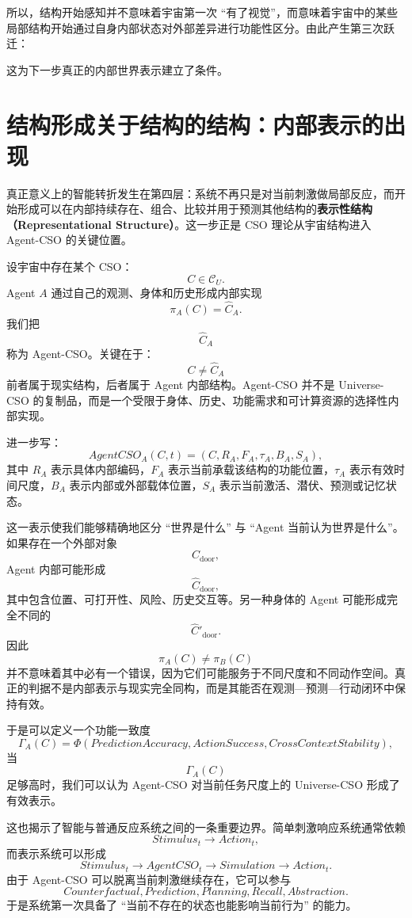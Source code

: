 所以，结构开始感知并不意味着宇宙第一次 ``有了视觉''，而意味着宇宙中的某些局部结构开始通过自身内部状态对外部差异进行功能性区分。由此产生第三次跃迁：
\begin{statementbox}
\centering
{}
\end{statementbox}
这为下一步真正的内部世界表示建立了条件。

\section{结构形成关于结构的结构：内部表示的出现}

真正意义上的智能转折发生在第四层：系统不再只是对当前刺激做局部反应，而开始形成可以在内部持续存在、组合、比较并用于预测其他结构的\textbf{表示性结构（Representational Structure）}。这一步正是 CSO 理论从宇宙结构进入 Agent-CSO 的关键位置。

设宇宙中存在某个 CSO：
\[
C\in\mathcal C_U.
\]
Agent $A$ 通过自己的观测、身体和历史形成内部实现
\[
\pi_A(C)=\hat C_A.
\]
我们把
\[
\hat C_A
\]
称为 Agent-CSO。关键在于：
\[
\boxed{
C\neq\hat C_A
}
\]
前者属于现实结构，后者属于 Agent 内部结构。Agent-CSO 并不是 Universe-CSO 的复制品，而是一个受限于身体、历史、功能需求和可计算资源的选择性内部实现。

进一步写：
\[
AgentCSO_A(C,t)
=
(C,R_A,F_A,\tau_A,B_A,S_A),
\]
其中 $R_A$ 表示具体内部编码，$F_A$ 表示当前承载该结构的功能位置，$\tau_A$ 表示有效时间尺度，$B_A$ 表示内部或外部载体位置，$S_A$ 表示当前激活、潜伏、预测或记忆状态。

这一表示使我们能够精确地区分 ``世界是什么'' 与 ``Agent 当前认为世界是什么''。如果存在一个外部对象
\[
C_{\text{door}},
\]
Agent 内部可能形成
\[
\hat C_{\text{door}},
\]
其中包含位置、可打开性、风险、历史交互等。另一种身体的 Agent 可能形成完全不同的
\[
\hat C'_{\text{door}}.
\]
因此
\[
\pi_A(C)\neq\pi_B(C)
\]
并不意味着其中必有一个错误，因为它们可能服务于不同尺度和不同动作空间。真正的判据不是内部表示与现实完全同构，而是其能否在观测—预测—行动闭环中保持有效。

于是可以定义一个功能一致度
\[
\Gamma_A(C)
=
\Phi(
PredictionAccuracy,
ActionSuccess,
CrossContextStability
),
\]
当
\[
\Gamma_A(C)
\]
足够高时，我们可以认为 Agent-CSO 对当前任务尺度上的 Universe-CSO 形成了有效表示。

这也揭示了智能与普通反应系统之间的一条重要边界。简单刺激响应系统通常依赖
\[
Stimulus_t\rightarrow Action_t,
\]
而表示系统可以形成
\[
Stimulus_t
\rightarrow
AgentCSO_t
\rightarrow
Simulation
\rightarrow
Action_t.
\]
由于 Agent-CSO 可以脱离当前刺激继续存在，它可以参与
\[
Counterfactual,
Prediction,
Planning,
Recall,
Abstraction.
\]
于是系统第一次具备了 ``当前不存在的状态也能影响当前行为'' 的能力。

